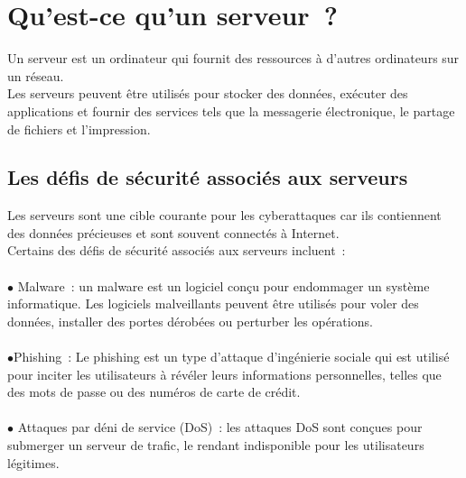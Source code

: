   \paragraph{ }
 \section{ Qu'est-ce qu'un serveur ? }

Un serveur est un ordinateur qui fournit des ressources à d'autres ordinateurs sur un réseau. \\Les serveurs peuvent être utilisés pour stocker des données, exécuter des applications et fournir des services tels que la messagerie électronique, le partage de fichiers et l'impression.\\

\subsection{ Les défis de sécurité associés aux serveurs}

Les serveurs sont une cible courante pour les cyberattaques car ils contiennent des données précieuses et sont souvent connectés à Internet.\\ Certains des défis de sécurité associés aux serveurs incluent :

 \paragraph{ } $\bullet$ Malware : un malware est un logiciel conçu pour endommager un système informatique. Les logiciels malveillants peuvent être utilisés pour voler des données, installer des portes dérobées ou perturber les opérations.
  \paragraph{ } $\bullet$Phishing :  Le phishing est un type d'attaque d'ingénierie sociale qui est utilisé pour inciter les utilisateurs à révéler leurs informations personnelles, telles que des mots de passe ou des numéros de carte de crédit.
  
 \paragraph{ }$\bullet$ Attaques par déni de service (DoS) :  les attaques DoS sont conçues pour submerger un serveur de trafic, le rendant indisponible pour les utilisateurs légitimes.\\
 
